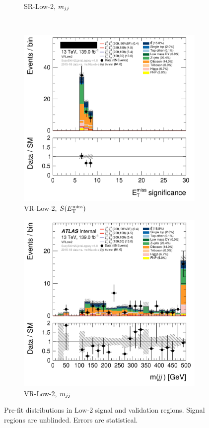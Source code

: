 \begin{figure}[tp]
\begin{subfigure}{0.48\textwidth}
\caption{SR-Low-2, $m_{jj}$}
\end{subfigure}
\\[0.5em]
\begin{subfigure}{0.48\textwidth}
\centering
\includegraphics[width=\textwidth]{figures/2ljets_def_met_Sign_VRLow2.png}
\caption{VR-Low-2, $S(E_\mathrm{T}^\mathrm{miss})$}
\end{subfigure}
\hfill
\begin{subfigure}{0.48\textwidth}
\centering
\includegraphics[width=\textwidth]{figures/2ljets_def_mjj_VRLow2.png}
\caption{VR-Low-2, $m_{jj}$}
\end{subfigure}
\caption[
Pre-fit distributions in Low-2 signal and validation regions
]{%
Pre-fit distributions in Low-2 signal and validation regions.
Signal regions are unblinded.
Errors are statistical.
}
\label{fig:2ljets_low2_region}
\end{figure}

